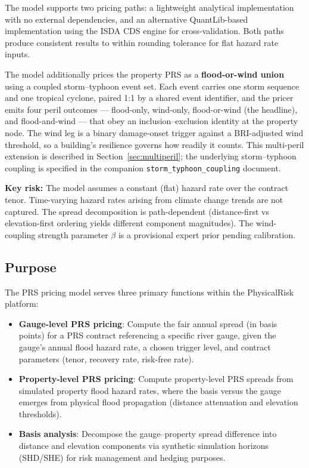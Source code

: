 \documentclass[11pt,a4paper]{article}
\begin{document}
The model supports two pricing paths: a lightweight analytical implementation with no
external dependencies, and an alternative QuantLib-based implementation using the ISDA
CDS engine for cross-validation. Both paths produce consistent results to within
rounding tolerance for flat hazard rate inputs.

The model additionally prices the property PRS as a \textbf{flood-or-wind union}
using a coupled storm--typhoon event set. Each event carries one storm sequence
and one tropical cyclone, paired 1:1 by a shared event identifier, and the pricer
emits four peril outcomes --- flood-only, wind-only, flood-or-wind (the headline),
and flood-and-wind --- that obey an inclusion--exclusion identity at the property
node. The wind leg is a binary damage-onset trigger against a BRI-adjusted wind
threshold, so a building's resilience governs how readily it counts. This
multi-peril extension is described in Section~\ref{sec:multiperil}; the underlying
storm--typhoon coupling is specified in the companion
\texttt{storm\_typhoon\_coupling} document.

\textbf{Key risk:} The model assumes a constant (flat) hazard rate over the contract
tenor. Time-varying hazard rates arising from climate change trends are not captured.
The spread decomposition is path-dependent (distance-first vs elevation-first ordering
yields different component magnitudes). The wind-coupling strength parameter
$\beta$ is a provisional expert prior pending calibration.


\mkmpurpose

\subsection{Purpose}

The PRS pricing model serves three primary functions within the PhysicalRisk platform:

\begin{itemize}[nosep]
    \item \textbf{Gauge-level PRS pricing}: Compute the fair annual spread (in basis
          points) for a PRS contract referencing a specific river gauge, given the
          gauge's annual flood hazard rate, a chosen trigger level, and contract
          parameters (tenor, recovery rate, risk-free rate).
    \item \textbf{Property-level PRS pricing}: Compute property-level PRS spreads from
          simulated property flood hazard rates, where the basis versus the gauge
          emerges from physical flood propagation (distance attenuation and elevation
          thresholds).
    \item \textbf{Basis analysis}: Decompose the gauge--property spread difference into
          distance and elevation components via synthetic simulation horizons (SHD/SHE)
          for risk management and hedging purposes.
\end{itemize}
\end{document}
